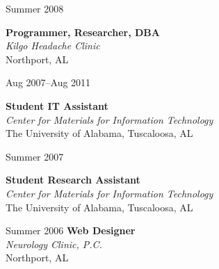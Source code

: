 \documentclass[11pt]{simplecv}
\newcommand{\stitle}{\textbf}
\newcommand{\splace}{\textit}
\newif\ifcv
\begin{document}
\begin{topic}
\item[Summer 2008] {  
  \stitle{Programmer, Researcher, DBA} \\
  \splace{Kilgo Headache Clinic} \\
  Northport, AL

\ifcv
  \begin{itemize}
    \item Managed MySQL database for research data.
    \item Created Java-based data entry client.
    \item Performed data entry.
  \end{itemize}
\fi
}

\item[Aug 2007--Aug 2011] {
  \stitle{Student IT Assistant} \\
  \splace{Center for Materials for Information Technology} \\
  The University of Alabama, Tuscaloosa, AL

\ifcv
  \begin{itemize}
    \item Managed Linux-based services.
    \item Created software solutions for IT problems.
    \item Improved many processes.
  \end{itemize}
\fi
}

\item[Summer 2007] {
  \stitle{Student Research Assistant} \\
  \splace{Center for Materials for Information Technology}  \\
  The University of Alabama, Tuscaloosa, AL

\ifcv
  \begin{itemize}
    \item Conducted research in magnetics.
    \item Created equipment documentation project.
  \end{itemize}
\fi
}

\item[Summer 2006] {
	\stitle{Web Designer} \\
	\splace{Neurology Clinic, P.C.} \\
	Northport, AL
}

\ifcv
	\item[Summer 2004] {
		\stitle{Intern} \\
		\splace{Tuscom Computer Solutions} \\
		Tuscaloosa, AL
	}
\fi

\end{topic}
\end{document}
